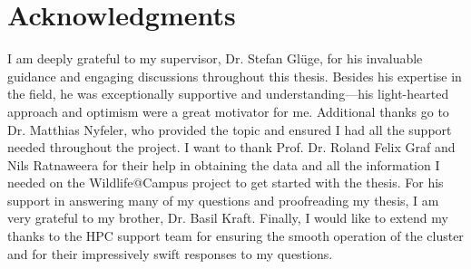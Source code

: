 

\vspace*{\fill}

\section*{Acknowledgments}
\label{acknowledgments}

I am deeply grateful to my supervisor, Dr. Stefan Glüge, for his invaluable guidance and engaging discussions throughout this thesis.
Besides his expertise in the field, he was exceptionally supportive and understanding---his light-hearted approach and optimism were a great motivator for me.
Additional thanks go to Dr. Matthias Nyfeler, who provided the topic and ensured I had all the support needed throughout the project.  
I want to thank Prof. Dr. Roland Felix Graf and Nils Ratnaweera for their help in obtaining the data and all the information I needed on the Wildlife@Campus project to get started with the thesis.
For his support in answering many of my questions and proofreading my thesis, I am very grateful to my brother, Dr. Basil Kraft.
Finally, I would like to extend my thanks to the HPC support team for ensuring the smooth operation of the cluster and for their impressively swift responses to my questions.
\vspace*{\fill}